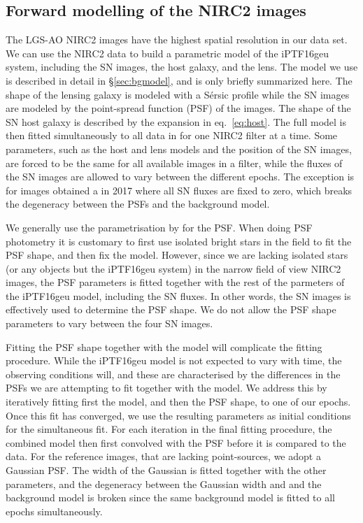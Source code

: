 \documentclass[a4paper,fleqn,usenatbib]{mnras}
\newcommand{\geu}{iPTF16geu\xspace}
\newcommand{\sn}{SN\xspace}
\begin{document}
\subsection{Forward modelling of the NIRC2 images}\label{sec:nirc2}
The LGS-AO NIRC2 images have the highest spatial resolution in our data set.  We can use the NIRC2 data to build a 
parametric model of the \geu system, including the \sn images, the host galaxy, and the lens.  The model we use is 
described in detail in \S\ref{sec:bgmodel}, and is only briefly summarized here. The shape of the lensing galaxy is modeled 
with a S\'ersic profile \citep{1963BAAA....6...41S} while the \sn images are 
modeled by the point-spread function (PSF) of the images.  The shape of the \sn host galaxy is described by the expansion 
in eq.~\eqref{eq:host}.  The full model is then fitted simultaneously to all data in for one NIRC2 filter 
at a time.  Some parameters,  such as the host and lens models and the position of the \sn images, are forced to be 
the same for all available images in a filter, while the fluxes of the \sn images are allowed to vary between the 
different epochs.  The exception is for images obtained a in 2017 where all \sn fluxes are fixed to zero, which breaks the 
degeneracy between the PSFs and the background model.

We generally use the parametrisation by \citet{1969A&A.....3..455M} for the PSF.  When doing PSF photometry it is customary 
to first use isolated bright stars in the field to fit the PSF shape, and then fix the model.  However, since we are lacking 
isolated stars (or any objects but the \geu system) in the narrow field of view NIRC2 images, the PSF parameters is fitted 
together with the rest of the parmeters of the \geu model, including the \sn fluxes.  In other words, the \sn images is effectively 
used to determine the PSF shape.  We do not allow the PSF shape parameters to vary between the four \sn images.

Fitting the PSF shape together with the model will complicate the fitting procedure.  While the \geu model is not expected to vary with
time, the observing conditions will, and these are characterised by the differences in the PSFs we are attempting to fit together 
with the model.  We address this by iteratively fitting first the model, and then the PSF shape, to one of our epochs.  Once this fit has
converged, we use the resulting parameters as initial conditions for the simultaneous fit.  For each iteration in the final 
fitting procedure, the combined model then first convolved with the PSF before it is compared to the data.   For the reference 
images, that are lacking point-sources, we adopt a Gaussian PSF.  The width of the Gaussian is fitted together with the 
other parameters, and the degeneracy between the Gaussian width and and the background model is broken since the same 
background model is fitted to all epochs simultaneously. 
\end{document}
